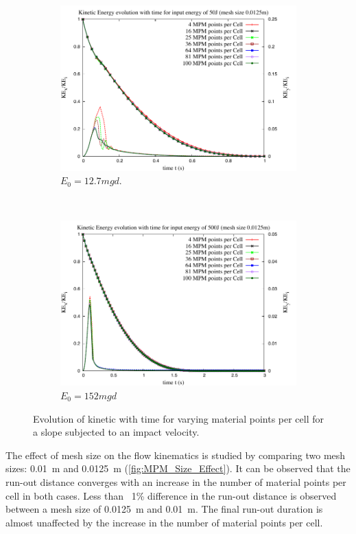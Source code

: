 \begin{figure}[tbhp]
\centering
\begin{subfigure}[b]{0.95\textwidth}
\includegraphics[width=\textwidth]{KE_50}
\caption{$E_0=12.7mgd$.}
\label{fig:KE_50}
\end{subfigure}
\\
\begin{subfigure}[b]{0.95\textwidth}
\centering
\includegraphics[width=\textwidth]{KE_500}
\caption{$E_0=152mgd$}
\label{fig:KE_500}
\end{subfigure}
\caption{Evolution of kinetic with time for varying material points per cell 
for a slope subjected to an impact velocity.}
\label{fig:KE_MPM}
\end{figure}

The effect of mesh size on the flow kinematics is studied by comparing two mesh 
sizes: 0.01~\si{\m} and 0.0125~\si{\m} (\cref{fig:MPM_Size_Effect}). It can 
be observed that the run-out distance converges with an increase in the number 
of material points per cell in both cases. Less than ~1\% difference in the 
run-out distance is observed between a mesh size of 0.0125~\si{\m} and 
0.01~\si{\m}. The final run-out duration is almost unaffected by the increase 
in the number of material points per cell. 
 

